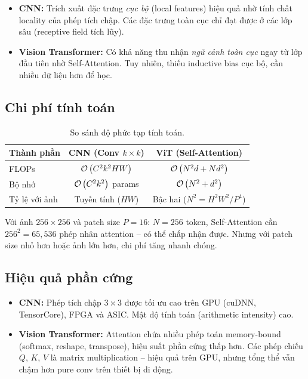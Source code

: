 \begin{itemize}
    \item \textbf{CNN:} Trích xuất đặc trưng \textit{cục bộ} (local features) hiệu quả nhờ tính chất locality của phép tích chập. Các đặc trưng toàn cục chỉ đạt được ở các lớp sâu (receptive field tích lũy).
    
    \item \textbf{Vision Transformer:} Có khả năng thu nhận \textit{ngữ cảnh toàn cục} ngay từ lớp đầu tiên nhờ Self-Attention. Tuy nhiên, thiếu inductive bias cục bộ, cần nhiều dữ liệu hơn để học.
\end{itemize}

\subsection{Chi phí tính toán}

\begin{table}[H]
\centering
\caption{So sánh độ phức tạp tính toán.}
\label{tab:compute_compare}
\begin{tabular}{l c c}
\toprule
\textbf{Thành phần} & \textbf{CNN (Conv $k \times k$)} & \textbf{ViT (Self-Attention)} \\
\midrule
FLOPs & $\mathcal{O}\left(C^2 k^2 HW\right)$ & $\mathcal{O}\left(N^2 d + N d^2\right)$ \\
Bộ nhớ & $\mathcal{O}\left(C^2 k^2\right)$ params & $\mathcal{O}\left(N^2 + d^2\right)$ \\
Tỷ lệ với ảnh & Tuyến tính ($HW$) & Bậc hai ($N^2 = H^2W^2/P^4$) \\
\bottomrule
\end{tabular}
\end{table}

Với ảnh $256 \times 256$ và patch size $P = 16$: $N = 256$ token, Self-Attention cần $256^2 = 65{,}536$ phép nhân attention -- có thể chấp nhận được. Nhưng với patch size nhỏ hơn hoặc ảnh lớn hơn, chi phí tăng nhanh chóng.

\subsection{Hiệu quả phần cứng}

\begin{itemize}
    \item \textbf{CNN:} Phép tích chập $3 \times 3$ được tối ưu cao trên GPU (cuDNN, TensorCore), FPGA và ASIC. Mật độ tính toán (arithmetic intensity) cao.
    
    \item \textbf{Vision Transformer:} Attention chứa nhiều phép toán memory-bound (softmax, reshape, transpose), hiệu suất phần cứng thấp hơn. Các phép chiếu $Q$, $K$, $V$ là matrix multiplication -- hiệu quả trên GPU, nhưng tổng thể vẫn chậm hơn pure conv trên thiết bị di động.
\end{itemize}

